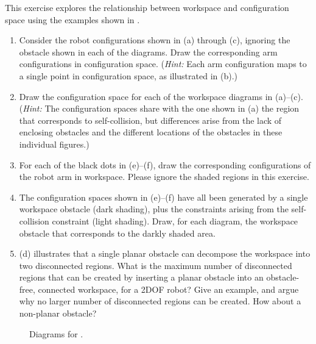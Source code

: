 \begin{exercise}%
This exercise explores the relationship between workspace and configuration space
using the examples shown in .
\begin{enumerate}
\item Consider the robot
configurations shown in (a) through (c), ignoring the
obstacle shown in each of the diagrams. Draw the corresponding arm
configurations in configuration space. ({\em Hint:} Each arm configuration
maps to a single point in configuration space, as illustrated in
(b).)

\item Draw the configuration space for each of the workspace diagrams in
(a)--(c).  ({\em Hint:} The configuration spaces share
with the one shown in (a) the region that corresponds
to self-collision, but differences arise from the lack of enclosing
obstacles and the different locations of the obstacles in these
individual figures.)

\item For each of the black dots in (e)--(f), draw the
corresponding configurations of the robot arm in workspace. Please
ignore the shaded regions in this exercise.

\item The configuration spaces shown in (e)--(f) have
all been generated by a single workspace obstacle (dark shading), plus
the constraints arising from the self-collision constraint (light
shading). Draw, for each diagram, the workspace obstacle that corresponds
to the darkly shaded area.

\item {}(d) illustrates that a single
planar obstacle can decompose the workspace into two disconnected
regions. What is the maximum number of disconnected regions that can be
created by inserting a planar obstacle into an obstacle-free,
connected workspace, for a 2DOF robot? Give an example, and argue why
no larger number of disconnected regions can be created. How about a 
non-planar obstacle?
\end{enumerate}
\end{exercise} 

\begin{figure}[t]
\caption{Diagrams for \protect{}.}
\label{FigEx2}
\end{figure} 


